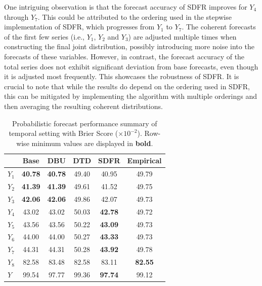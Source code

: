 \documentclass[a4paper,review,12pt,authoryear]{elsarticle}
\theoremstyle{definition}
\begin{document}
     One intriguing observation is that the forecast accuracy of SDFR improves for $Y_4$ through $Y_7$.
     This could be attributed to the ordering used in the stepwise implementation of SDFR, which progresses from $Y_1$ to $Y_7$. The coherent forecasts of the first few series (i.e., $Y_1$, $Y_2$ and $Y_3$) are adjusted multiple times when constructing the final joint distribution, possibly introducing more noise into the forecasts of these variables. However, in contrast, the forecast accuracy of the total series does not exhibit significant deviation from base forecasts,  even though it is adjusted most frequently. This showcases the robustness of SDFR. It is crucial to note that while the results do depend on the ordering used in SDFR, this can be mitigated by implementing the algorithm with multiple orderings and then averaging the resulting coherent distributions.

     \begin{table}
     \centering
     \caption{\label{tab:sim_temporal_res_dist} Probabilistic forecast performance summary of temporal setting with Brier Score ($\times 10^{-2}$). Row-wise minimum values are displayed in \textbf{bold}.}
     \begin{tabular}{lccccc}
     \toprule
      & Base & DBU & DTD & SDFR & Empirical \\\midrule
      $Y_1$ & \textbf{40.78} & \textbf{40.78} & 49.40 & 40.95 & 49.79 \\ 
      $Y_2$ & \textbf{41.39} & \textbf{41.39} & 49.61 & 41.52 & 49.75 \\ 
      $Y_3$ & \textbf{42.06} & \textbf{42.06} & 49.86 & 42.07 & 49.73 \\ 
      $Y_4$ & 43.02 & 43.02 & 50.03 & \textbf{42.78} & 49.72 \\ 
      $Y_5$ & 43.56 & 43.56 & 50.22 & \textbf{43.09} & 49.73 \\ 
      $Y_6$ & 44.00 & 44.00 & 50.27 & \textbf{43.33} & 49.73 \\ 
      $Y_7$ & 44.31 & 44.31 & 50.28 & \textbf{43.92} & 49.78 \\ 
      $Y_8$ & 82.58 & 83.48 & 82.58 & 83.11 & \textbf{82.55} \\ 
      $Y$ & 99.54 & 97.77 & 99.36 & \textbf{97.74} & 99.12 \\ 
     \bottomrule
     \end{tabular}
     \end{table}
\end{document}
